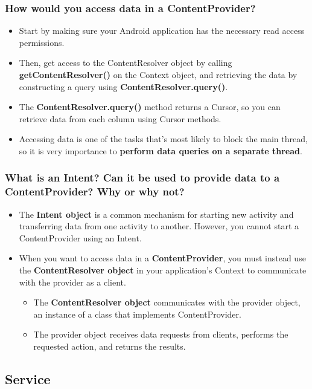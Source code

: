 \documentclass[9pt, b5paper]{article}
\begin{document}
\subsubsection{How would you access data in a ContentProvider?}
\label{sec-1-3-5}
\begin{itemize}
\item Start by making sure your Android application has the necessary read access permissions.
\item Then, get access to the ContentResolver object by calling \textbf{getContentResolver()} on the Context object, and retrieving the data by constructing a query using \textbf{ContentResolver.query()}.
\item The \textbf{ContentResolver.query()} method returns a Cursor, so you can retrieve data from each column using Cursor methods.
\item Accessing data is one of the tasks that's most likely to block the main thread, so it is very importance to \textbf{perform data queries on a separate thread}.
\end{itemize}

\subsubsection{What is an Intent? Can it be used to provide data to a ContentProvider? Why or why not?}
\label{sec-1-3-6}
\begin{itemize}
\item The \textbf{Intent object} is a common mechanism for starting new activity and transferring data from one activity to another. However, you cannot start a ContentProvider using an Intent.
\item When you want to access data in a \textbf{ContentProvider}, you must instead use the \textbf{ContentResolver object} in your application's Context to communicate with the provider as a client. 
\begin{itemize}
\item The \textbf{ContentResolver object} communicates with the provider object, an instance of a class that implements ContentProvider.
\item The provider object receives data requests from clients, performs the requested action, and returns the results.
\end{itemize}
\end{itemize}

\subsection{Service}
\label{sec-1-4}
\end{document}
